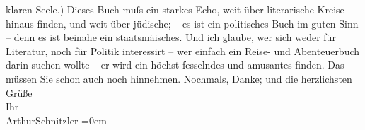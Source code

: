 \begin{ledgroupsized}[t]{13cm}
               klaren Seele.) Dieses Buch
               muſs ein starkes Echo, weit über literarische Kreise hinaus finden, und weit über
               jüdische; – es ist ein politisches Buch im guten Sinn – denn es ist beinahe ein
                  staatsmä{\geminationn}isches. Und ich glaube, wer sich weder für
               Literatur, noch {\pb}für Politik interessirt –
               wer einfach ein Reise- und Abenteuerbuch darin \strikeout{\textcolor{gray}{finden}} suchen wollte – er wird ein höchst fesselndes und amusantes \strikeout{\textcolor{gray}{darin}} finden. Das müssen Sie schon
               auch noch hinnehmen.\pend
           \pstart
           Nochmals, Danke; und die herzlichsten Grüße {\\[\baselineskip]}Ihr {\\[\baselineskip]}\spacefill\mbox{ArthurSchnitzler}\pend
           \leftskip=0em{}
         
         \endnumbering{}\end{ledgroupsized}  \newcommand{\dateiname}{L03021}\newcommand{\titel}{Arthur Schnitzler an Felix Salten, 6. 5. 1925}\newcommand{\editorInnen}{Martin Anton Müller und Laura Untner}
      